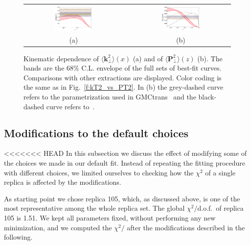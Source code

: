 \documentclass[aps,preprintnumbers,showpacs,nofootinbib,superscriptaddress,floatfix]{revtex4}
\newcommand{\T}{\perp}
\begin{document}
\begin{figure}[h!]
\centering
\begin{tabular}{ccc}
\includegraphics[width=0.40\textwidth]{plots/kT2av_Compare_with_other_extractions_flINDEP.pdf}
&\hspace{0.001cm}
&
\includegraphics[width=0.40\textwidth]{plots/PT2av_Compare_with_other_extractions_flINDEP.pdf}
\\
(a) && (b)
\end{tabular}
\caption{Kinematic dependence of $\big \langle \bm{k}_{\T}^2 \big \rangle (x)$ (a) and of $\big \langle \bm{P}_{\perp}^2 \big \rangle (z)$ (b). The bands are the $68\%$ C.L. envelope of the full sets of best-fit curves. Comparisons with other extractions are displayed. Color coding is the same as in Fig.~\ref{f:kT2_vs_PT2}.  In (b) the grey-dashed curve refers to the parametrization used in GMCtrans~\cite{gmctrans} and the black-dashed curve refers to~\cite{Boglione:1999pz}. }
\label{f:avmomenta_68CL}
\end{figure}


\subsection{Modifications to the default choices}
\label{ss:replica105}

<<<<<<< HEAD
In this subsection we discuss the effect of modifying some of the choices we
made in our default fit. Instead of repeating the fitting procedure with
different choices, we limited ourselves to checking how the $\chi^2$ of a single
replica is affected by the modifications. 

As starting point we chose replica
105, which, as discussed above, is one of the most representative among the
whole replica set. 
The global $\chi^2/$d.o.f.\ of replica 105 is 1.51. We kept all parameters
fixed, without performing any new minimization, 
and we computed the $\chi^2/$ after the modifications described in the
following.
\end{document}
